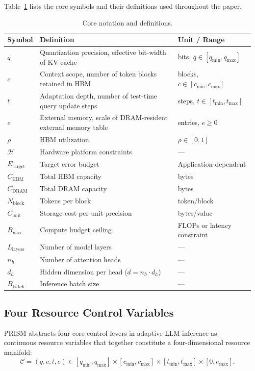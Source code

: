 \documentclass[11pt,a4paper]{article}
\theoremstyle{plain}
\theoremstyle{definition}
\begin{document}
Table~\ref{tab:notation} lists the core symbols and their definitions used throughout the paper.

\begin{table}[htbp]
\centering
\caption{Core notation and definitions.}
\label{tab:notation}
\begin{tabular}{lll}
\toprule
\textbf{Symbol} & \textbf{Definition} & \textbf{Unit / Range} \\
\midrule
$q$ & Quantization precision, effective bit-width of KV cache & bits, $q \in [q_{\min}, q_{\max}]$ \\
$c$ & Context scope, number of token blocks retained in HBM & blocks, $c \in [c_{\min}, c_{\max}]$ \\
$t$ & Adaptation depth, number of test-time query update steps & steps, $t \in [t_{\min}, t_{\max}]$ \\
$e$ & External memory, scale of DRAM-resident external memory table & entries, $e \geq 0$ \\
$\rho$ & HBM utilization & $\rho \in [0,1]$ \\
$\mathcal{H}$ & Hardware platform constraints & --- \\
$E_{\text{target}}$ & Target error budget & Application-dependent \\
$C_{\text{HBM}}$ & Total HBM capacity & bytes \\
$C_{\text{DRAM}}$ & Total DRAM capacity & bytes \\
$N_{\text{block}}$ & Tokens per block & token/block \\
$C_{\text{unit}}$ & Storage cost per unit precision & bytes/value \\
$B_{\max}$ & Compute budget ceiling & FLOPs or latency constraint \\
$L_{\text{layers}}$ & Number of model layers & --- \\
$n_h$ & Number of attention heads & --- \\
$d_h$ & Hidden dimension per head ($d = n_h \cdot d_h$) & --- \\
$B_{\text{batch}}$ & Inference batch size & --- \\
\bottomrule
\end{tabular}
\end{table}

\subsection{Four Resource Control Variables}

PRISM abstracts four core control levers in adaptive LLM inference as continuous resource variables that together constitute a four-dimensional resource manifold:
\[
\mathcal{C} = (q, c, t, e) \in [q_{\min}, q_{\max}] \times [c_{\min}, c_{\max}] \times [t_{\min}, t_{\max}] \times [0, e_{\max}].
\]
\end{document}
